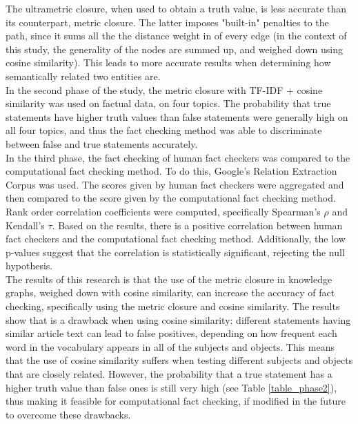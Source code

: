 \documentclass[10pt,11pt,12pt,oneside]{book}
\begin{document}
The ultrametric closure, when used to obtain a truth value, is less accurate than its counterpart, metric closure. The latter imposes "built-in" penalties to the path, since it sums all the the distance weight in of every edge \cite{simas2015distance} (in the context of this study, the generality of the nodes are summed up, and weighed down using cosine similarity). This leads to more accurate results when determining how semantically related two entities are.\\

In the second phase of the study, the metric closure with TF-IDF + cosine similarity was used on factual data, on four topics. The probability that true statements have higher truth values than false statements were generally high on all four topics, and thus the fact checking method was able to discriminate between false and true statements accurately.\\

In the third phase, the fact checking of human fact checkers was compared to the computational fact checking method. To do this, Google's Relation Extraction Corpus was used. The scores given by human fact checkers were aggregated and then compared to the score given by the computational fact checking method. Rank order correlation coefficients were computed, specifically Spearman's $ \rho $ and Kendall's $ \tau $. Based on the results, there is a positive correlation between human fact checkers and the computational fact checking method. Additionally, the low p-values suggest that the correlation is statistically significant, rejecting the null hypothesis.\\

The results of this research is that the use of the metric closure in knowledge graphs, weighed down with cosine similarity, can increase the accuracy of fact checking, specifically using the metric closure and cosine similarity. The results show that is a drawback when using cosine similarity: different statements having similar article text can lead to false positives, depending on how frequent each word in the vocabulary appears in all of the subjects and objects. This means that the use of cosine similarity suffers when testing different subjects and objects that are closely related. However, the probability that a true statement has a higher truth value than false ones is still very high (see Table \ref{table_phase2}), thus making it feasible for computational fact checking, if modified in the future to overcome these drawbacks.
\end{document}
